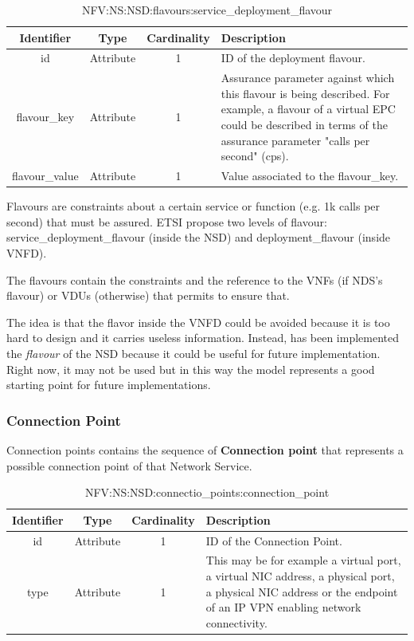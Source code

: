 \documentclass[11pt, english]{article}
\begin{document}
\begin{table}[ht]
    \centering
    \begin{tabular}{c|c|c|m{7cm}}
    \hline
    Identifier & Type & Cardinality & Description \\
    \hline
    \rowcolor{Gray}
    id & Attribute & 1 & ID of the deployment flavour. \\
    \hline
    flavour\_key & Attribute & 1 & Assurance parameter against which this flavour is being described. For example, a flavour of a virtual EPC could be described in terms of the assurance parameter "calls per second" (cps).\\
    \hline
    \rowcolor{Gray}
    flavour\_value & Attribute & 1 & Value associated to the flavour\_key. \\
    \hline
    \end{tabular}
    \caption{NFV:NS:NSD:flavours:service\_deployment\_flavour} \label{tab:tab14}
\end{table}

Flavours are constraints about a certain service or function (e.g. 1k calls per second) that must be assured.  ETSI propose two levels of flavour: service\_deployment\_flavour (inside the NSD) and deployment\_flavour (inside VNFD).

The flavours contain the constraints and the reference to the VNFs (if NDS's flavour) or VDUs (otherwise) that permits to ensure that.

The idea is that the flavor inside the VNFD could be avoided because it is too hard to design and it carries useless information. Instead, has been implemented the \textit{flavour} of the NSD because it could be useful for future implementation. Right now, it may not be used but in this way the model represents a good starting point for future implementations.

\subsubsection{Connection Point}
Connection points contains the sequence of \textbf{Connection point} that represents a possible connection point of that Network Service.

\begin{table}[ht]
    \centering
    \begin{tabular}{c|c|c|m{7cm}}
    \hline
    Identifier & Type & Cardinality & Description \\
    \hline
    \rowcolor{Gray}
    id & Attribute & 1 & ID of the Connection Point. \\
    \hline
    type & Attribute & 1 & This may be for example a virtual port, a virtual NIC address, a physical port, a physical NIC address or the endpoint of an IP VPN enabling network connectivity. \\
    \hline
    \end{tabular}
    \caption{NFV:NS:NSD:connectio\_points:connection\_point} \label{tab:tab15}
\end{table}
\end{document}
